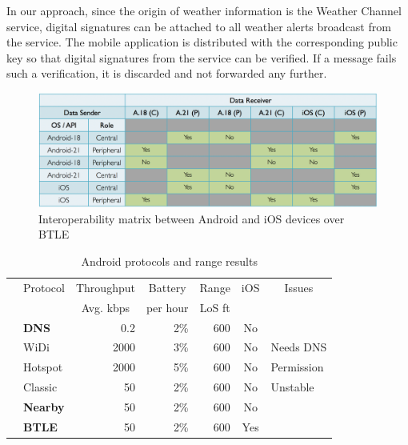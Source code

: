 \documentclass[conference]{IEEEtran}
\begin{document}
In our approach, since the origin of weather information is the
Weather Channel service, digital signatures can be attached to all
weather alerts broadcast from the service. The mobile application is
distributed with the corresponding public key so that digital
signatures from the service can be verified. If a message fails such a
verification, it is discarded and not forwarded any further.

\begin{figure}[htbp]
\centerline{\includegraphics[width=\columnwidth]{figs/android_ios}}
\caption{Interoperability matrix between Android and iOS devices over BTLE}
\label{fig:android_ios}
\end{figure}


\begin{table}[H]
\caption{Android protocols and range results}
\centering
\begin{tabular}{|c|l|r|r|r|c|l|}
\hline
& \multicolumn{1}{c|}{Protocol} & \multicolumn{1}{c|}{Throughput} & \multicolumn{1}{c|}{Battery} & \multicolumn{1}{c|}{Range} & \multicolumn{1}{c|}{iOS} & \multicolumn{1}{c|}{Issues}\\
&                               & \multicolumn{1}{c|}{Avg. kbps}  & \multicolumn{1}{c|}{per hour} & \multicolumn{1}{c|}{LoS ft} &                  &                            \\
\hline
\parbox[t]{2mm}{} & \textbf{DNS} & 0.2 & 2\% & 600 & No & \\
& WiDi & 2000 & 3\% & 600 & No & Needs DNS\\
& Hotspot & 2000 & 5\% & 600 & No & Permission\\
\hline
\parbox[t]{2mm}{} & Classic & 50 & 2\% & 600 & No & Unstable\\
& \textbf{Nearby} & 50 & 2\% & 600 & No & \\
& \textbf{BTLE} & 50 & 2\% & 600 & Yes & \\
\hline
\end{tabular}
\end{table}
\end{document}
